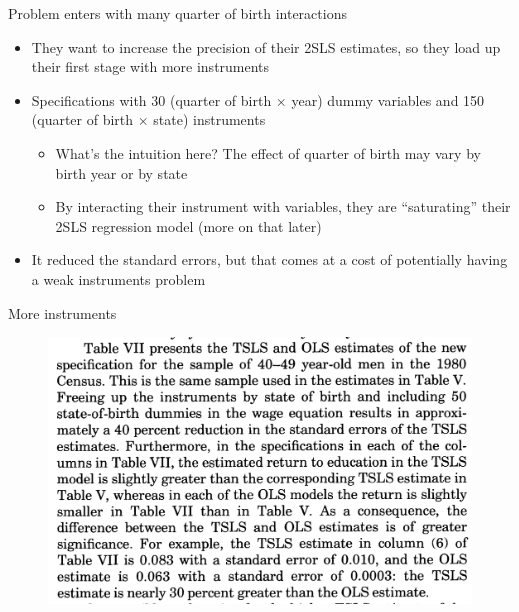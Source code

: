 \documentclass{beamer}
\begin{document}
\begin{frame}{Problem enters with many quarter of birth interactions}
  \begin{itemize}
    \item They want to increase the precision of their 2SLS estimates, so they load up their first stage with more instruments
    \item Specifications with 30 (quarter of birth $\times$ year) dummy variables and 150 (quarter of birth $\times$ state) instruments
          \begin{itemize}
            \item What's the intuition here?  The effect of quarter of birth may vary by birth year or by state
            \item By interacting their instrument with variables, they are ``saturating'' their 2SLS regression model (more on that later)
          \end{itemize}
    \item It reduced the standard errors, but that comes at a cost of potentially having a weak instruments problem
  \end{itemize}
\end{frame}




\begin{frame}{More instruments}

  \begin{figure}
    \includegraphics[scale=.25]{./lecture_includes/weak_qob2.png}
  \end{figure}


\end{frame}
\end{document}
